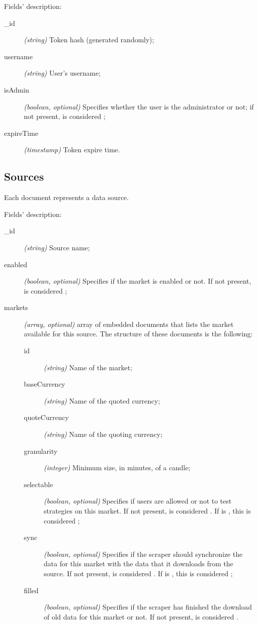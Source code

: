 Fields' description:
\begin{description}
	\item[\_id] \textit{(string)} Token hash (generated randomly);
	\item[username] \textit{(string)} User's username;
	\item[isAdmin] \textit{(boolean, optional)} Specifies whether the user
		is the administrator or not; if not present, is considered
		;
	\item[expireTime] \textit{(timestamp)} Token expire time.
\end{description}

\subsection{Sources}

Each document represents a data source.



Fields' description:
\begin{description}
	\item[\_id] \textit{(string)} Source name;
	\item[enabled] \textit{(boolean, optional)} Specifies if the market is
		enabled or not. If not present, is considered ;
	\item[markets] \textit{(array, optional)} array of embedded documents
		that lists the market available for this source. The structure
		of these documents is the following:
		\begin{description}
			\item[id] \textit{(string)} Name of the market;
			\item[baseCurrency] \textit{(string)} Name of the quoted
				currency;
			\item[quoteCurrency] \textit{(string)} Name of the
				quoting currency;
			\item[granularity] \textit{(integer)} Minimum size,
				in minutes, of a candle;
			\item[selectable] \textit{(boolean, optional)} Specifies
				if users are allowed or not to test strategies
				on this market. If not present, is considered
				. If  is ,
				this is considered ;
			\item[sync] \textit{(boolean, optional)} Specifies if
				the scraper should synchronize the data for this
				market with the data that it downloads from the
				source. If not present, is considered
				. If  is ,
				this is considered ;
			\item[filled] \textit{(boolean, optional)} Specifies if
				the scraper has finished the download of old
				data for this market or not. If not present, is
				considered .
		\end{description}
\end{description}

